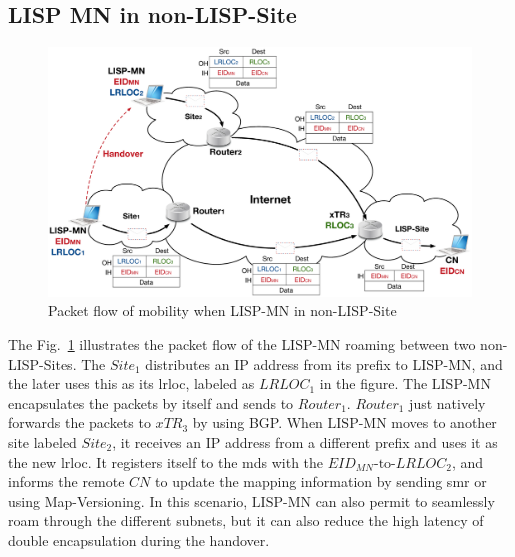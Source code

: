 \subsection{LISP MN in non-LISP-Site}
\label{subsec:lispMN_NLS}

\begin{figure}[!t]
	\centering
	\includegraphics[width=\textwidth]{Pics/LISP-MN_in_non-LISP-Site.eps}
	\caption{Packet flow of mobility when LISP-MN in non-LISP-Site}
	\label{LISP-MN_in_non-LISP-Site}
\end{figure}
The Fig.~\ref{LISP-MN_in_non-LISP-Site} illustrates the packet flow of the $\text{LISP-MN}$ roaming between two non-LISP-Sites. The $Site_1$ distributes an IP address from its prefix to $\text{LISP-MN}$, and the later uses this as its \acrshort{lrloc}, labeled as $LRLOC_1$ in the figure. The $\text{LISP-MN}$ encapsulates the packets by itself and sends to $Router_1$. $Router_1$ just natively forwards the packets to $xTR_3$ by using BGP. When $\text{LISP-MN}$ moves to another site labeled $Site_2$, it receives an IP address from a different prefix and uses it as the new \acrshort{lrloc}. It registers itself to the \acrshort{mds} with the $EID_{MN}\text{-to-}LRLOC_2$, and informs the remote $CN$ to update the mapping information by sending \acrshort{smr} or using Map-Versioning. In this scenario, $\text{LISP-MN}$ can also permit to seamlessly roam through the different subnets, but it can also reduce the high latency of double encapsulation during the handover. 



